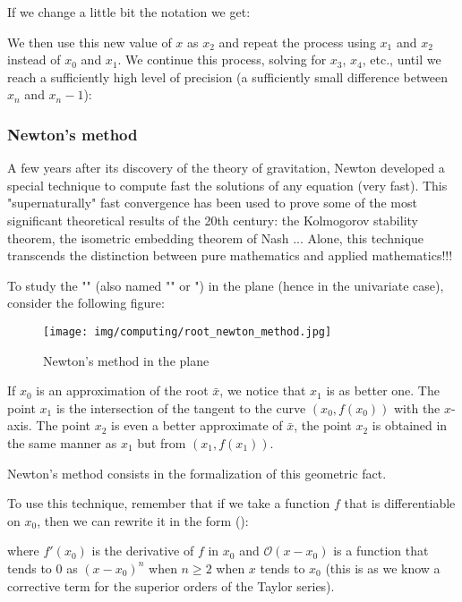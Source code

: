 	If we change a little bit the notation we get:
	
	We then use this new value of $x$ as $x_2$ and repeat the process using $x_1$ and $x_2$ instead of $x_0$ and $x_1$. We continue this process, solving for $x_3$, $x_4$, etc., until we reach a sufficiently high level of precision (a sufficiently small difference between $x_n$ and $x_n - 1$):
	
	
	\pagebreak
	\subsubsection{Newton's method}\label{newton method}
	A few years after its discovery of the theory of gravitation, Newton developed a special technique to compute fast the solutions of any equation (very fast). This "supernaturally" fast convergence has been used to prove some of the most significant theoretical results of the 20th century: the Kolmogorov stability theorem, the isometric embedding theorem of Nash ... Alone, this technique transcends the distinction between pure mathematics and applied mathematics!!!
	
	To study the "" (also named "" or ") in the plane (hence in the univariate case), consider the following figure:
	\begin{figure}[H]
		\centering
		\texttt{[image: img/computing/root\_newton\_method.jpg]}
		\caption{Newton's method in the plane}
	\end{figure}
	If $x_0$ is an approximation of the root $\bar{x}$, we notice that $x_1$ is as better one. The point $x_1$ is the intersection of the tangent to the curve $(x_0,f(x_0))$ with the $x$-axis. The point $x_2$ is even a better approximate of $\bar{x}$, the point $x_2$ is obtained in the same manner as $x_1$ but from $(x_1,f(x_1))$.
	
	Newton's method consists in the formalization of this geometric fact.
	
	To use this technique, remember that if we take a function $f$ that is differentiable on $x_0$, then we can rewrite it in the form ():
	
	where $f'(x_0)$ is the derivative of $f$ in $x_0$ and $\mathcal{O}(x-x_0)$ is a function that tends to $0$ as $(x-x_0)^n$ when $n \geq 2$ when $x$ tends to $x_0$ (this is as we know a corrective term for the superior orders of the Taylor series).
	
